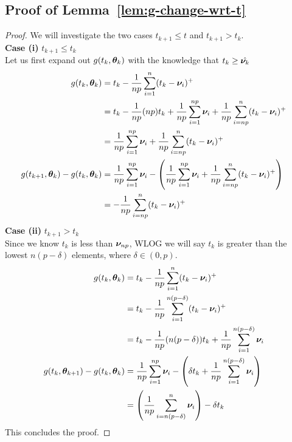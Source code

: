 \documentclass{article} %
\begin{document}
\begin{appendices}
	\subsection{Proof of Lemma~\ref{lem:g-change-wrt-t}}
	\label{app:g-change-wrt-t}
	\begin{proof}
		We will investigate the two cases $t_{k+1} \leq t$ and $t_{k+1} > t_k$.\\
		\textbf{Case (i)} $t_{k+1} \leq t_k$\\
		Let us first expand out $g(t_k,{\bm{\theta}}_k)$ with the knowledge that $t_k \geq \hat{{\bm{\nu}}_{k}}$
		\begin{align}
			g(t_k, {\bm{\theta}}_k) &= t_k - \frac{1}{np}\sum_{i=1}^{n}(t_k-{\bm{\nu}}_i)^+ &&\\
			&= t_k - \frac{1}{np}(np)t_k + \frac{1}{np}\sum_{i=1}^{np}{\bm{\nu}}_i + \frac{1}{np}\sum_{i=np}^{n}(t_k - {\bm{\nu}}_i)^+ &&\\
			&= \frac{1}{np}\sum_{i=1}^{np}{\bm{\nu}}_i + \frac{1}{np}\sum_{i=np}^{n}(t_k - {\bm{\nu}}_i)^+ &&\\
			g(t_{k+1},{\bm{\theta}}_k) - g(t_k,{\bm{\theta}}_k) &=  \frac{1}{np}\sum_{i=1}^{np}{\bm{\nu}}_i - \left(\frac{1}{np}\sum_{i=1}^{np}{\bm{\nu}}_i + \frac{1}{np}\sum_{i=np}^{n}(t_k - {\bm{\nu}}_i)^+\right) &&\\
			&= - \frac{1}{np}\sum_{i=np}^{n}(t_k - {\bm{\nu}}_i)^+ &&
		\end{align}
		\textbf{Case (ii)} $t_{k+1} > t_k$\\
		Since we know $t_k$ is less than ${\bm{\nu}}_{np}$, WLOG we will say $t_k$ is greater than the lowest $n(p-\delta)$ elements, where $\delta \in (0,p)$. 
		\begin{align}
			g(t_k,{\bm{\theta}}_k) &= t_k - \frac{1}{np}\sum_{i=1}^n(t_k - {\bm{\nu}}_i)^+ &&\\
			&= t_k - \frac{1}{np}\sum_{i=1}^{n(p-\delta)}(t_k - {\bm{\nu}}_i)^+ &&\\
			&= t_k - \frac{1}{np}(n(p-\delta))t_k + \frac{1}{np}\sum_{i=1}^{n(p-\delta)}{\bm{\nu}}_i &&\\
			g(t_k,{\bm{\theta}}_{k+1}) - g(t_k,{\bm{\theta}}_k) &= \frac{1}{np}\sum_{i=1}^{np}{\bm{\nu}}_i - \left(\delta t_k + \frac{1}{np}\sum_{i=1}^{n(p-\delta)}{\bm{\nu}}_i\right) &&\\
			&= \left(\frac{1}{np}\sum_{i=n(p-\delta)}^n{\bm{\nu}}_i\right) - \delta t_k &&
		\end{align}
		This concludes the proof.
	\end{proof}
  	
  	\newpage

\end{appendices}
\end{document}
